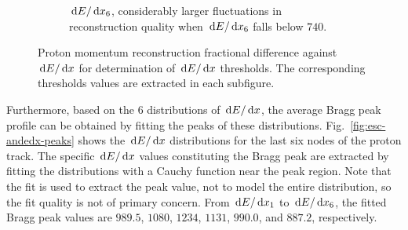 \begin{figure}[ht]
\begin{subfigure}{\dbfigwid\textwidth}
           \caption{$\,\textrm{d}E/\,\textrm{d}x_6$, considerably larger fluctuations in reconstruction quality when $\,\textrm{d}E/\,\textrm{d}x_6$ falls below $740$.}
           \label{subfig:dedx5}
      \end{subfigure}
      \caption{Proton momentum reconstruction fractional difference against $\,\textrm{d}E/\,\textrm{d}x$ for determination of $\,\textrm{d}E/\,\textrm{d}x$ thresholds. The corresponding thresholds values are extracted in each subfigure.}
      \label{fig:esc-andedx-slice}
  \end{figure}

     Furthermore, based on the $6$ distributions of $\,\textrm{d}E/\,\textrm{d}x$, the average Bragg peak profile can be obtained by fitting the peaks of these distributions.
     Fig.~\ref{fig:esc-andedx-peaks} shows the $\,\textrm{d}E/\,\textrm{d}x$ distributions for the last six nodes of the proton track.
     The specific $\,\textrm{d}E/\,\textrm{d}x$ values constituting the Bragg peak are extracted by fitting the distributions with a Cauchy function near the peak region.
     Note that the fit is used to extract the peak value, not to model the entire distribution, so the fit quality is not of primary concern.
     From $\,\textrm{d}E/\,\textrm{d}x_1$ to $\,\textrm{d}E/\,\textrm{d}x_6$, the fitted Bragg peak values are $989.5$, $1080$, $1234$, $1131$, $990.0$, and $887.2$, respectively.

